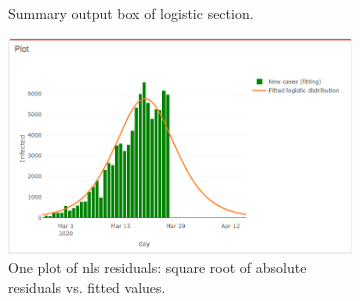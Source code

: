 \documentclass[
12pt, %
a4paper, %
oneside, %
headinclude,footinclude, %
BCOR5mm, %
]{scrartcl}
\begin{document}
\begin{figure}[H]
\begin{subfigure}{0.6\textwidth}
  \caption{Summary output box of logistic section.}
  \label{fig:logistic_plot1}
\end{subfigure} 
\hspace{5.5cm}
\begin{subfigure}{0.6\textwidth}
  \includegraphics[width=1\linewidth]{Figures/logistic_plot2.png} 
  \caption{One plot of nls residuals: square root of absolute residuals vs. fitted values.}
  \label{fig:logistic_plot2}
\end{subfigure}
\caption{ }
\label{fig:logistic_plots_set}
\end{figure}
\end{document}
